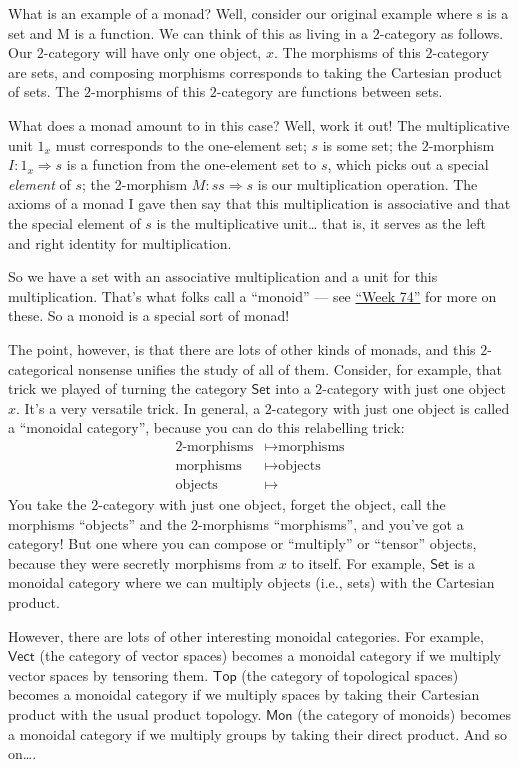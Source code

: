 \documentclass{article}
\begin{document}
What is an example of a monad? Well, consider our original example where
s is a set and M is a function. We can think of this as living in a
\(2\)-category as follows. Our \(2\)-category will have only one object,
\(x\). The morphisms of this \(2\)-category are sets, and composing
morphisms corresponds to taking the Cartesian product of sets. The
\(2\)-morphisms of this \(2\)-category are functions between sets.

What does a monad amount to in this case? Well, work it out! The
multiplicative unit \(1_x\) must corresponds to the one-element set;
\(s\) is some set; the \(2\)-morphism \(I\colon 1_x\Rightarrow s\) is a
function from the one-element set to \(s\), which picks out a special
\emph{element} of \(s\); the 2-morphism \(M\colon ss\Rightarrow s\) is
our multiplication operation. The axioms of a monad I gave then say that
this multiplication is associative and that the special element of \(s\)
is the multiplicative unit\ldots{} that is, it serves as the left and
right identity for multiplication.

So we have a set with an associative multiplication and a unit for this
multiplication. That's what folks call a ``monoid'' --- see
\protect\hyperlink{week74}{``Week 74''} for more on these. So a monoid
is a special sort of monad!

The point, however, is that there are lots of other kinds of monads, and
this \(2\)-categorical nonsense unifies the study of all of them.
Consider, for example, that trick we played of turning the category
\(\mathsf{Set}\) into a \(2\)-category with just one object \(x\). It's
a very versatile trick. In general, a \(2\)-category with just one
object is called a ``monoidal category'', because you can do this
relabelling trick: \[
  \begin{aligned}
    \text{2-morphisms} &\mapsto \text{morphisms}
  \\\text{morphisms} &\mapsto \text{objects}
  \\\text{objects} &\mapsto 
  \end{aligned}
\] You take the \(2\)-category with just one object, forget the object,
call the morphisms ``objects'' and the \(2\)-morphisms ``morphisms'',
and you've got a category! But one where you can compose or ``multiply''
or ``tensor'' objects, because they were secretly morphisms from \(x\)
to itself. For example, \(\mathsf{Set}\) is a monoidal category where we
can multiply objects (i.e., sets) with the Cartesian product.

However, there are lots of other interesting monoidal categories. For
example, \(\mathsf{Vect}\) (the category of vector spaces) becomes a
monoidal category if we multiply vector spaces by tensoring them.
\(\mathsf{Top}\) (the category of topological spaces) becomes a monoidal
category if we multiply spaces by taking their Cartesian product with
the usual product topology. \(\mathsf{Mon}\) (the category of monoids)
becomes a monoidal category if we multiply groups by taking their direct
product. And so on\ldots.
\end{document}
